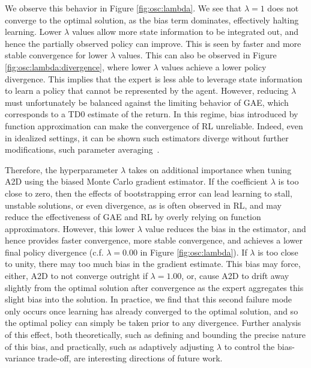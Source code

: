 We observe this behavior in Figure \ref{fig:osc:lambda}.  We see that $\lambda=1$ does not converge to the optimal solution, as the bias term dominates, effectively halting learning.  Lower $\lambda$ values allow more state information to be integrated out, and hence the partially observed policy can improve.  This is seen by faster and more stable convergence for lower $\lambda$ values.  This can also be observed in Figure \ref{fig:osc:lambda:divergence}, where lower $\lambda$ values achieve a lower policy divergence.  This implies that the expert is less able to leverage state information to learn a policy that cannot be represented by the agent.  However, reducing $\lambda$ must unfortunately be balanced against the limiting behavior of GAE, which corresponds to a TD0 estimate of the return.  In this regime, bias introduced by function approximation can make the convergence of RL unreliable.  Indeed, even in idealized settings, it can be shown such estimators diverge without further modifications, such parameter averaging~\citep{maei2009convergent}.

Therefore, the hyperparameter $\lambda$ takes on additional importance when tuning A2D using the biased Monte Carlo gradient estimator.  If the coefficient $\lambda$ is too close to zero, then the effects of bootstrapping error can lead learning to stall, unstable solutions, or even divergence, as is often observed in RL, and may reduce the effectiveness of GAE and RL by overly relying on function approximators.  However, this lower $\lambda$ value reduces the bias in the estimator, and hence provides faster convergence, more stable convergence, and achieves a lower final policy divergence (c.f. $\lambda = 0.00$ in Figure \ref{fig:osc:lambda}).  If $\lambda$ is too close to unity, there may too much bias in the gradient estimate.  This bias may force, either, A2D to not converge outright if $\lambda = 1.00$, or, cause A2D to drift away slightly from the optimal solution after convergence as the expert aggregates this slight bias into the solution.  In practice, we find that this second failure mode only occurs once learning has already converged to the optimal solution, and so the optimal policy can simply be taken prior to any divergence.  Further analysis of this effect, both theoretically, such as defining and bounding the precise nature of this bias, and practically, such as adaptively adjusting $\lambda$ to control the bias-variance trade-off, are interesting directions of future work.  



